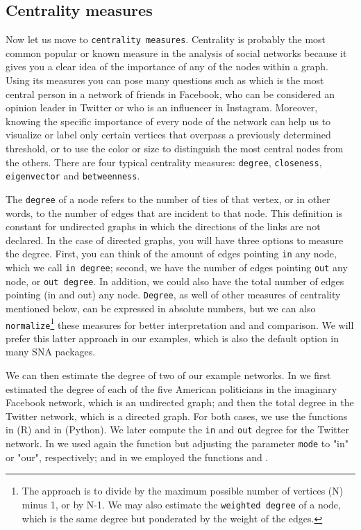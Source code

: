 
\subsection{Centrality measures}

Now let us move to \texttt{centrality measures}. Centrality is probably the most common popular or known measure in the analysis of social networks because it gives you a clear idea of the importance of any of the nodes within a graph. Using its measures you can pose many questions such as which is the most central person in a network of friends in Facebook, who can be considered an opinion leader in Twitter or who is an influencer in Instagram. Moreover, knowing the specific importance of every node of the network can help us to visualize or label only certain vertices that overpass a previously determined threshold, or to use the color or size to distinguish the most central nodes from the others. There are four typical centrality measures: \texttt{degree}, \texttt{closeness}, \texttt{eigenvector} and \texttt{betweenness}.

The \texttt{degree} of a node refers to the number of ties of that vertex, or in other words, to the number of edges that are incident to that node. This definition is constant for undirected graphs in which the directions of the links are not declared. In the case of directed graphs, you will have three options to measure the degree. First, you can think of the amount of edges pointing \texttt{in} any node, which we call \texttt{in degree}; second, we have the number of edges pointing \texttt{out} any node, or \texttt{out degree}. In addition, we could also have the total number of edges pointing (in and out) any node. \texttt{Degree}, as well of other measures of centrality mentioned below, can be expressed in absolute numbers, but we can also \texttt{normalize}\footnote{The approach is to divide by the maximum possible number of vertices (N) minus 1, or by N-1. We may also estimate the \texttt{weighted degree} of a node, which is the same degree but ponderated by the weight of the edges.}  these measures for better interpretation and and comparison. We will prefer this latter approach in our examples, which is also the default option in many SNA packages.

We can then estimate the degree of two of our example networks. In  we first estimated the degree of each of the five American politicians in the imaginary Facebook network, which is an undirected graph; and then the total degree in the Twitter network, which is a directed graph. For both cases, we use the functions  in  (R) and  in  (Python). We later compute the \texttt{in} and \texttt{out} degree for the Twitter network. In  we used again the function  but adjusting the parameter \texttt{mode} to "in" or "our", respectively; and in  we employed the functions  and .

